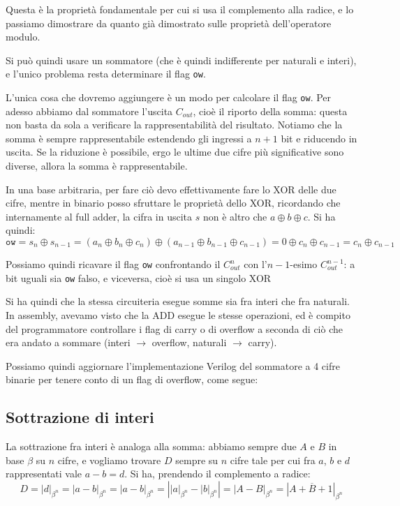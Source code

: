 \documentclass[a4paper,11pt]{article}
\begin{document}
Questa è la proprietà fondamentale per cui si usa il complemento alla radice, e lo passiamo dimostrare da quanto già dimostrato sulle proprietà dell'operatore modulo.

Si può quindi usare un sommatore (che è quindi indifferente per naturali e interi), e l'unico problema resta determinare il flag \lstinline|ow|.

L'unica cosa che dovremo aggiungere è un modo per calcolare il flag \lstinline|ow|.
Per adesso abbiamo dal sommatore l'uscita $C_{out}$, cioè il riporto della somma: questa non basta da sola a verificare la rappresentabilità del risultato.
Notiamo che la somma è sempre rappresentabile estendendo gli ingressi a $n+1$ bit e riducendo in uscita. Se la riduzione è possibile, ergo le ultime due cifre più significative sono diverse, allora la somma è rappresentabile.

In una base arbitraria, per fare ciò devo effettivamente fare lo XOR delle due cifre, mentre in binario posso sfruttare le proprietà dello XOR, ricordando che internamente al full adder, la cifra in uscita $s$ non è altro che $a \oplus b \oplus c$. Si ha quindi:
$$
\mathtt{ow} = s_n \oplus s_{n-1} = (a_{n} \oplus b_{n} \oplus c_{n}) \oplus (a_{n-1} \oplus b_{n-1} \oplus c_{n-1}) = 0 \oplus c_n \oplus c_{n-1} = c_n \oplus c_{n-1}
$$

Possiamo quindi ricavare il flag \lstinline|ow| confrontando il $C^{n}_{out}$ con l'$n-1$-esimo $C^{n-1}_{out}$: a bit uguali sia \lstinline|ow| falso, e viceversa, cioè si usa un singolo XOR

Si ha quindi che la stessa circuiteria esegue somme sia fra interi che fra naturali.
In assembly, avevamo visto che la ADD esegue le stesse operazioni, ed è compito del programmatore controllare i flag di carry o di overflow a seconda di ciò che era andato a sommare (interi $\rightarrow$ overflow, naturali $\rightarrow$ carry).

Possiamo quindi aggiornare l'implementazione Verilog del sommatore a 4 cifre binarie per tenere conto di un flag di overflow, come segue:



\subsection{Sottrazione di interi}
La sottrazione fra interi è analoga alla somma: abbiamo sempre due $A$ e $B$ in base $\beta$ su $n$ cifre, e vogliamo trovare $D$ sempre su $n$ cifre tale per cui fra $a$, $b$ e $d$ rappresentati vale $a - b = d$.
Si ha, prendendo il complemento a radice:
$$  
D = |d|_{\beta^n} = |a-b|_{\beta^n} = \left| a - b \right|_{\beta^{n}} = \left| |a|_{\beta^n} - |b|_{\beta^n} \right| = |A - B|_{\beta^n} = |A + \overline{B} + 1|_{\beta^n}
$$
\end{document}
